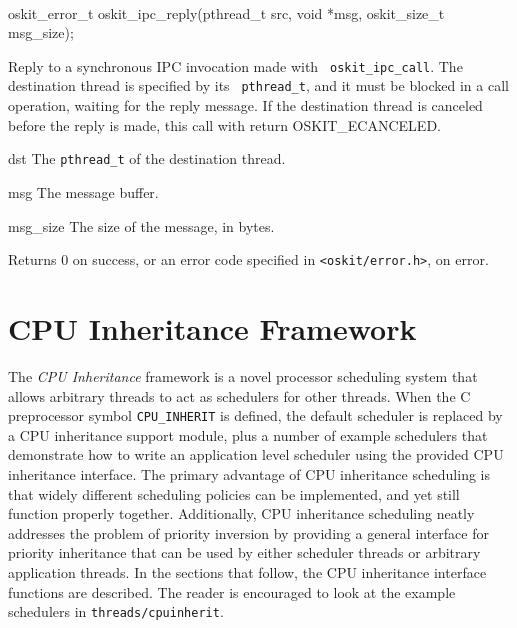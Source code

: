 \begin{apisyn}
	\\

	\funcproto oskit_error_t
	oskit_ipc_reply(pthread_t src, void *msg, oskit_size_t msg_size);
\end{apisyn}
\begin{apidesc}
	Reply to a synchronous IPC invocation made with {\tt
	oskit_ipc_call}. The destination thread is specified by its {\tt
	pthread_t}, and it must be blocked in a call operation, waiting for
	the reply message. If the destination thread is canceled before the
	reply is made, this call with return OSKIT_ECANCELED.
\end{apidesc}
\begin{apiparm}
	\item[dst]
		The {\tt pthread_t} of the destination thread.
	\item[msg]
		The message buffer.
	\item[msg_size]
		The size of the message, in bytes.
\end{apiparm}
\begin{apiret}
	Returns 0 on success, or an error code specified in
	{\tt <oskit/error.h>}, on error.
\end{apiret}


\section{CPU Inheritance Framework}
\label{cpuinherit}

The \emph{CPU Inheritance} framework is a novel processor scheduling system
that allows arbitrary threads to act as schedulers for other threads. When
the C preprocessor symbol \texttt{CPU_INHERIT} is defined, the default
\posix{} scheduler is replaced by a CPU inheritance support module, plus a
number of example schedulers that demonstrate how to write an application
level scheduler using the \oskit{} provided CPU inheritance interface.  The
primary advantage of CPU inheritance scheduling is that widely different
scheduling policies can be implemented, and yet still function properly
together. Additionally, CPU inheritance scheduling neatly addresses the
problem of priority inversion by providing a general interface for
priority inheritance that can be used by either scheduler threads or
arbitrary application threads. In the sections that follow, the CPU
inheritance interface functions are described. The reader is encouraged to
look at the example schedulers in {\tt threads/cpuinherit}.


